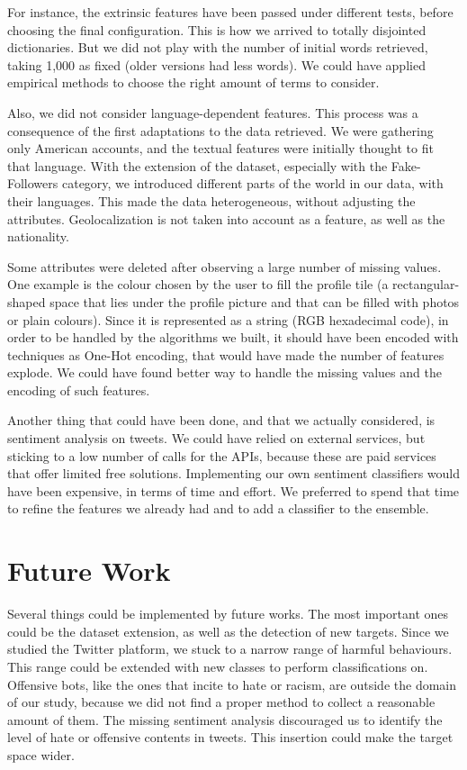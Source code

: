 For instance, the extrinsic features have been passed under different tests, before choosing the final configuration. This is how we arrived to totally disjointed dictionaries. But we did not play with the number of initial words retrieved, taking 1,000 as fixed (older versions had less words). We could have applied empirical methods to choose the right amount of terms to consider.

Also, we did not consider language-dependent features. This process was a consequence of the first adaptations to the data retrieved. We were gathering only American accounts, and the textual features were initially thought to fit that language.
With the extension of the dataset, especially with the Fake-Followers category, we introduced different parts of the world in our data, with their languages. This made the data heterogeneous, without adjusting the attributes. Geolocalization is not taken into account as a feature, as well as the nationality. 

Some attributes were deleted after observing a large number of missing values. One example is the colour chosen by the user to fill the profile tile (a rectangular-shaped space that lies under the profile picture and that can be filled with photos or plain colours). Since it is represented as a string (RGB hexadecimal code), in order to be handled by the algorithms we built, it should have been encoded with techniques as One-Hot encoding, that would have made the number of features explode. We could have found better way to handle the missing values and the encoding of such features.

Another thing that could have been done, and that we actually considered, is sentiment analysis on tweets. We could have relied on external services, but sticking to a low number of calls for the APIs, because these are paid services that offer limited free solutions. Implementing our own sentiment classifiers would have been expensive, in terms of time and effort. We preferred to spend that time to refine the features we already had and to add a classifier to the ensemble.

\section{Future Work}
Several things could be implemented by future works. The most important ones could be the dataset extension, as well as the detection of new targets.
Since we studied the Twitter platform, we stuck to a narrow range of harmful behaviours. This range could be extended with new classes to perform classifications on. Offensive bots, like the ones that incite to hate or racism, are outside the domain of our study, because we did not find a proper method to collect a reasonable amount of them. The missing sentiment analysis discouraged us to identify the level of hate or offensive contents in tweets. This insertion could make the target space wider.

